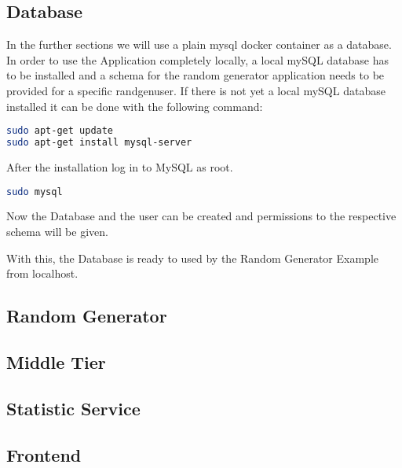 \subsection{Database}
In the further sections we will use a plain mysql docker container as a database. In order to use the Application completely locally, a local mySQL database has to be installed and a schema for the random generator application needs to be provided for a specific randgenuser.
If there is not yet a local mySQL database installed it can be done with the following command:
\begin{lstlisting}[language=Bash]
sudo apt-get update
sudo apt-get install mysql-server
\end{lstlisting}
After the installation log in to MySQL as root. 
\begin{lstlisting}[language=Bash]
sudo mysql
\end{lstlisting}
Now the Database and the user can be created and permissions to the respective schema will be given.

With this, the Database is ready to used by the Random Generator Example from localhost.
\newpage
\subsection{Random Generator}


\newpage

\subsection{Middle Tier}



\newpage

\subsection{Statistic Service}

\newpage
\subsection{Frontend}


